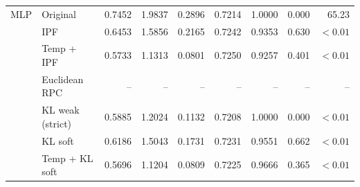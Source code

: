 \begin{tabular}{llrrrrrrr}
MLP & Original & 0.7452 & 1.9837 & 0.2896 & 0.7214 & 1.0000 & 0.000 & 65.23 \\
 & IPF & 0.6453 & 1.5856 & 0.2165 & 0.7242 & 0.9353 & 0.630 & $<0.01$ \\
 & Temp + IPF & 0.5733 & 1.1313 & 0.0801 & 0.7250 & 0.9257 & 0.401 & $<0.01$ \\
 & Euclidean RPC & -- & -- & -- & -- & -- & -- & -- \\
 & KL weak (strict) & 0.5885 & 1.2024 & 0.1132 & 0.7208 & 1.0000 & 0.000 & $<0.01$ \\
 & KL soft & 0.6186 & 1.5043 & 0.1731 & 0.7231 & 0.9551 & 0.662 & $<0.01$ \\
 & Temp + KL soft & 0.5696 & 1.1204 & 0.0809 & 0.7225 & 0.9666 & 0.365 & $<0.01$ \\
\bottomrule
\end{tabular}
